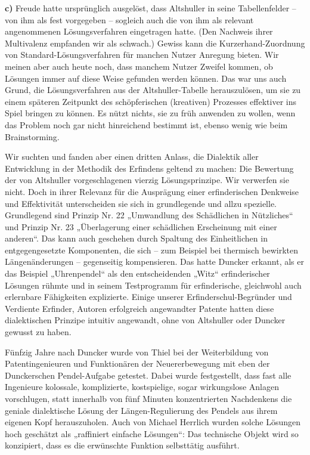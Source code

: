 \documentclass[11pt,a4paper]{article}
\begin{document}
\textbf{c)} 
Freude hatte ursprünglich ausgelöst, dass Altshuller in seine Tabellenfelder –
von ihm als fest vorgegeben -- sogleich auch die von ihm als relevant
angenommenen Lösungsverfahren eingetragen hatte. (Den Nachweis ihrer
Multivalenz empfanden wir als schwach.) Gewiss kann die Kurzerhand-Zuordnung
von Standard-Lösungsverfahren für manchen Nutzer Anregung bieten. Wir meinen
aber auch heute noch, dass manchem Nutzer Zweifel kommen, ob Lösungen immer auf
diese Weise gefunden werden können. Das war uns auch Grund, die
Lösungsverfahren aus der Altshuller-Tabelle herauszulösen, um sie zu einem
späteren Zeitpunkt des schöpferischen (kreativen) Prozesses effektiver ins
Spiel bringen zu können. Es nützt nichts, sie zu früh anwenden zu wollen, wenn
das Problem noch gar nicht hinreichend bestimmt ist, ebenso wenig wie beim
Brainstorming.
\enlargethispage{-2em}

Wir suchten und fanden aber einen dritten Anlass, die Dialektik aller
Entwicklung in der Methodik des Erfindens geltend zu machen: Die Bewertung der
von Altshuller vorgeschlagenen vierzig Lösungsprinzipe. Wir verwerfen sie
nicht.  Doch in ihrer Relevanz für die Ausprägung einer erfinderischen
Denkweise und Effektivität unterscheiden sie sich in grundlegende und allzu
spezielle.  Grundlegend sind Prinzip Nr. 22 „Umwandlung des Schädlichen in
Nützliches“ und Prinzip Nr. 23 „Überlagerung einer schädlichen Erscheinung mit
einer anderen“. Das kann auch geschehen durch Spaltung des Einheitlichen in
entgegengesetzte Komponenten, die sich – zum Beispiel bei thermisch bewirkten
Längenänderungen -- gegenseitig kompensieren. Das hatte Duncker erkannt, als er
das Beispiel „Uhrenpendel“ als den entscheidenden „Witz“ erfinderischer
Lösungen rühmte und in seinem Testprogramm für erfinderische, gleichwohl auch
erlernbare Fähigkeiten explizierte. Einige unserer Erfinderschul-Begründer und
Verdiente Erfinder, Autoren erfolgreich angewandter Patente hatten diese
dialektischen Prinzipe intuitiv angewandt, ohne von Altshuller oder Duncker
gewusst zu haben.

Fünfzig Jahre nach Duncker wurde von Thiel bei der Weiterbildung von
Patentingenieuren und Funktionären der Neuererbewegung mit eben der
Dunckerschen Pendel-Aufgabe getestet. Dabei wurde festgestellt, dass fast alle
Ingenieure kolossale, komplizierte, kostspielige, sogar wirkungslose Anlagen
vorschlugen, statt innerhalb von fünf Minuten konzentrierten Nachdenkens die
geniale dialektische Lösung der Längen-Regulierung des Pendels aus ihrem
eigenen Kopf herauszuholen. Auch von Michael Herrlich wurden solche Lösungen
hoch geschätzt als „raffiniert einfache Lösungen“: Das technische Objekt wird
so konzipiert, dass es die erwünschte Funktion selbsttätig ausführt.
\end{document}
